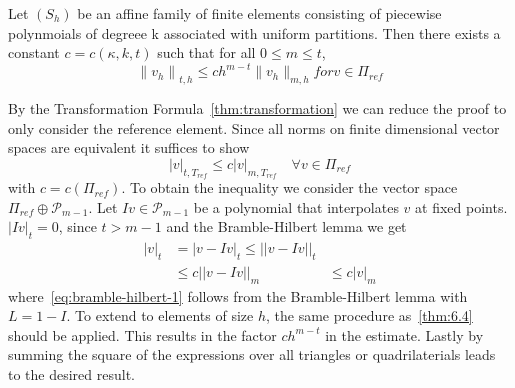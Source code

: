 \begin{thmx}
    Let $(S_h)$ be an affine family of finite elements consisting of piecewise polynmoials of degreee k associated with uniform partitions. Then there exists a constant $c = c(\kappa, k, t)$ such that for all $0 \leq m \leq t$,
    \begin{equation}
        {\|v_h\|}_{t,h} \leq ch^{m-t}\|v_h\|_{m,h} for v \in \Pi_{ref}
    \end{equation}
\end{thmx}

\begin{bev}
    By the Transformation Formula~\ref{thm:transformation} we can reduce the proof to only consider the reference element. Since all norms on finite dimensional vector spaces are equivalent it suffices to show
    \begin{equation}
        |v|_{t,T_{ref}} \leq c |v|_{m, T_{ref}} \quad \forall v \in \Pi_{ref}
    \end{equation}
    with $c = c(\Pi_{ref})$. To obtain the inequality we consider the vector space $\Pi_{ref}\oplus \mathcal{P}_{m-1}$. Let $Iv \in \mathcal{P}_{m-1}$ be a polynomial that interpolates $v$ at fixed points. $|Iv|_t = 0$, since $t > m-1$ and the Bramble-Hilbert lemma we get
    \begin{align}
        |v|_t &= |v-Iv|_t \leq ||v-Iv||_t \\
              &\leq c||v-Iv||_m 
              &\leq c|v|_m\label{eq:bramble-hilbert-1}
    \end{align}
    where~\eqref{eq:bramble-hilbert-1} follows from the Bramble-Hilbert lemma with $L=1-I$. To extend to elements of size $h$, the same procedure as~\ref{thm:6.4} should be applied. This results in the factor $ch^{m-t}$ in the estimate. Lastly by summing the square of the expressions over all triangles or quadrilaterials leads to the desired result.
\end{bev}
